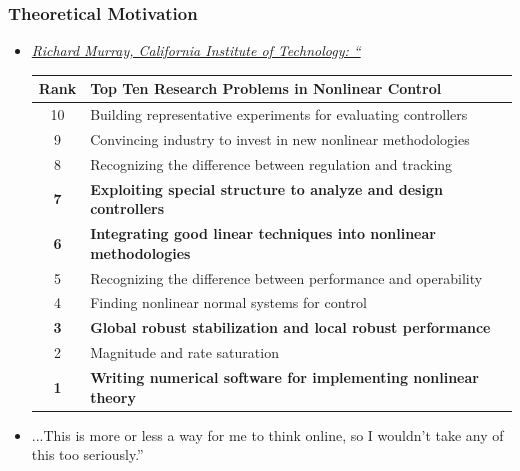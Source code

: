 \documentclass{beamer}
\newcommand{\blue}{\color[rgb]{0,0,1}}
\begin{document}
  {
  \frametitle{Theoretical Motivation}
  \begin{itemize}
  \item {\scriptsize \href{http://www.cds.caltech.edu/~murray/archive/topten/}{\emph{Richard Murray, California Institute of Technology: ``}}} 
  \begin{center}
  \begin{tabular}{|c|p{9cm}|}
\hline
\textbf{Rank} &	\textbf{Top Ten Research Problems in Nonlinear Control}\\\hline
{\scriptsize 10} &	{\scriptsize Building representative experiments for evaluating controllers} \\\hline
{\scriptsize 9} &	{\scriptsize Convincing industry to invest in new nonlinear methodologies} \\\hline
{\scriptsize 8} &	{\scriptsize Recognizing the difference between regulation and tracking}\\\hline
{\scriptsize \textbf{{\blue 7}}} &	{\scriptsize \textbf{{\blue Exploiting special structure to analyze and design controllers}}}\\\hline
{\scriptsize\textbf{{\blue 6}}} &	{\scriptsize \textbf{{\blue Integrating good linear techniques into nonlinear methodologies}}}\\\hline
{\scriptsize 5} &	{\scriptsize Recognizing the difference between performance and operability}\\\hline
{\scriptsize 4} &	{\scriptsize Finding nonlinear normal systems for control}\\\hline
{\scriptsize\textbf{{\blue 3}}} &	{\scriptsize\textbf{{\blue Global robust stabilization and local robust performance}}}\\\hline
{\scriptsize 2} &	{\scriptsize Magnitude and rate saturation}\\\hline
{\scriptsize\textbf{{\blue 1}}} &	{\scriptsize\textbf{{\blue Writing numerical software for implementing nonlinear theory}}}\\\hline
  \end{tabular}
  \end{center}
  \item \parbox{10cm}{{\scriptsize ...This is more or less a way for me to think online, so I wouldn't take any of this too seriously.''}}
  \end{itemize}
}
\end{document}
